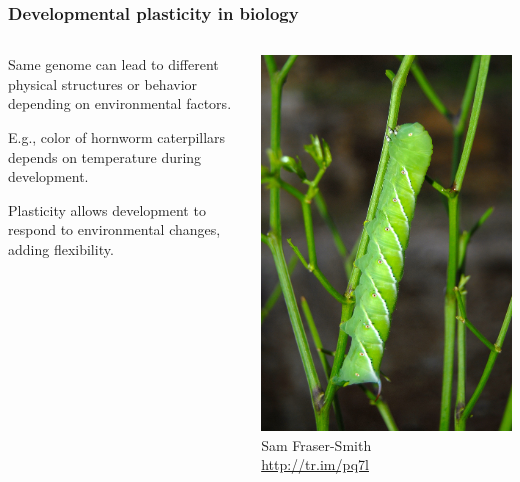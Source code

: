 \documentclass{beamer}
\newcommand{\linespace}{\vskip 0.25cm}
\begin{document}
\begin{frame}
  \frametitle{Developmental plasticity in biology}
  
  \begin{columns}
  \begin{column}{.65\textwidth}
Same genome can lead to different physical structures or behavior depending on environmental factors.

\linespace

E.g., color of hornworm caterpillars depends on temperature during development. 

\linespace
  
  Plasticity allows development to respond to environmental changes, adding flexibility.
  \end{column}
  \begin{column}{.35\textwidth}
    \includegraphics[width=.95\textwidth]{Illustrations/Manduca_sexta_by_Sam_Fraser-Smith_from_Flickr.jpg}
    \\
    \tiny{Sam Fraser-Smith \\ \url{http://tr.im/pq7l} }
  \end{column}
  \end{columns}

\end{frame}
\end{document}
